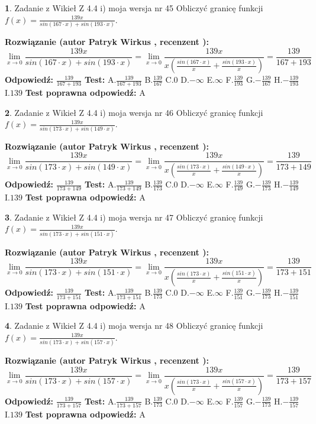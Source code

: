 \documentclass[12pt, a4paper]{article}
\theoremstyle{definition} %
\newtheorem{zad}{}
\newcommand{\zadStart}[1]{\begin{zad}#1\newline}
\newcommand{\zadStop}{\end{zad}}
\newcommand{\rozwStart}[2]{\noindent \textbf{Rozwiązanie (autor #1 , recenzent #2): }\newline}
\newcommand{\rozwStop}{\newline}
\newcommand{\odpStart}{\noindent \textbf{Odpowiedź:}\newline}
\newcommand{\odpStop}{\newline}
\newcommand{\testStart}{\noindent \textbf{Test:}\newline}
\newcommand{\testStop}{\newline}
\newcommand{\kluczStart}{\noindent \textbf{Test poprawna odpowiedź:}\newline}
\newcommand{\kluczStop}{\newline}
\begin{document}
\zadStart{Zadanie z Wikieł Z 4.4 i) moja wersja nr 45}
Obliczyć granicę funkcji $f(x)=\frac{139x}{sin(167\cdot x) +sin(193\cdot x)}$.
\zadStop
\rozwStart{Patryk Wirkus}{}
$$\lim\limits_{x\to 0}\frac{139x}{sin(167\cdot x) +sin(193\cdot x)}=\lim\limits_{x\to 0}\frac{139x}{x(\frac{sin(167\cdot x)}{x}+\frac{sin(193\cdot x)}{x})}=\frac{139}{167+193}$$
\rozwStop
\odpStart
$\frac{139}{167+193}$
\odpStop
\testStart
A.$\frac{139}{167+193}$
B.$\frac{139}{167}$
C.$0$
D.$-\infty$
E.$\infty$
F.$\frac{139}{193}$
G.$-\frac{139}{167}$
H.$-\frac{139}{193}$
I.$139$
\testStop
\kluczStart
A
\kluczStop



\zadStart{Zadanie z Wikieł Z 4.4 i) moja wersja nr 46}
Obliczyć granicę funkcji $f(x)=\frac{139x}{sin(173\cdot x) +sin(149\cdot x)}$.
\zadStop
\rozwStart{Patryk Wirkus}{}
$$\lim\limits_{x\to 0}\frac{139x}{sin(173\cdot x) +sin(149\cdot x)}=\lim\limits_{x\to 0}\frac{139x}{x(\frac{sin(173\cdot x)}{x}+\frac{sin(149\cdot x)}{x})}=\frac{139}{173+149}$$
\rozwStop
\odpStart
$\frac{139}{173+149}$
\odpStop
\testStart
A.$\frac{139}{173+149}$
B.$\frac{139}{173}$
C.$0$
D.$-\infty$
E.$\infty$
F.$\frac{139}{149}$
G.$-\frac{139}{173}$
H.$-\frac{139}{149}$
I.$139$
\testStop
\kluczStart
A
\kluczStop



\zadStart{Zadanie z Wikieł Z 4.4 i) moja wersja nr 47}
Obliczyć granicę funkcji $f(x)=\frac{139x}{sin(173\cdot x) +sin(151\cdot x)}$.
\zadStop
\rozwStart{Patryk Wirkus}{}
$$\lim\limits_{x\to 0}\frac{139x}{sin(173\cdot x) +sin(151\cdot x)}=\lim\limits_{x\to 0}\frac{139x}{x(\frac{sin(173\cdot x)}{x}+\frac{sin(151\cdot x)}{x})}=\frac{139}{173+151}$$
\rozwStop
\odpStart
$\frac{139}{173+151}$
\odpStop
\testStart
A.$\frac{139}{173+151}$
B.$\frac{139}{173}$
C.$0$
D.$-\infty$
E.$\infty$
F.$\frac{139}{151}$
G.$-\frac{139}{173}$
H.$-\frac{139}{151}$
I.$139$
\testStop
\kluczStart
A
\kluczStop



\zadStart{Zadanie z Wikieł Z 4.4 i) moja wersja nr 48}
Obliczyć granicę funkcji $f(x)=\frac{139x}{sin(173\cdot x) +sin(157\cdot x)}$.
\zadStop
\rozwStart{Patryk Wirkus}{}
$$\lim\limits_{x\to 0}\frac{139x}{sin(173\cdot x) +sin(157\cdot x)}=\lim\limits_{x\to 0}\frac{139x}{x(\frac{sin(173\cdot x)}{x}+\frac{sin(157\cdot x)}{x})}=\frac{139}{173+157}$$
\rozwStop
\odpStart
$\frac{139}{173+157}$
\odpStop
\testStart
A.$\frac{139}{173+157}$
B.$\frac{139}{173}$
C.$0$
D.$-\infty$
E.$\infty$
F.$\frac{139}{157}$
G.$-\frac{139}{173}$
H.$-\frac{139}{157}$
I.$139$
\testStop
\kluczStart
A
\kluczStop
\end{document}

